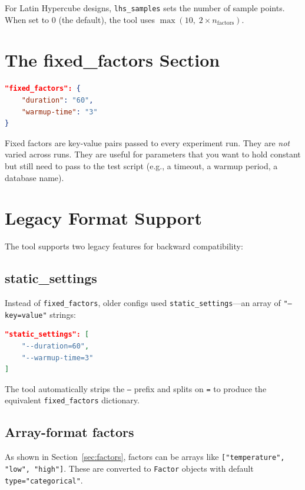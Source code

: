 \documentclass[11pt]{book}
\begin{document}
For Latin Hypercube designs, \texttt{lhs\_samples} sets the number of sample points. When set to 0 (the default), the tool uses $\max(10,\; 2 \times n_{\text{factors}})$.

\section{The fixed\_factors Section}

\begin{lstlisting}[language=json]
"fixed_factors": {
    "duration": "60",
    "warmup-time": "3"
}
\end{lstlisting}

Fixed factors are key-value pairs passed to every experiment run. They are \emph{not} varied across runs. They are useful for parameters that you want to hold constant but still need to pass to the test script (e.g., a timeout, a warmup period, a database name).

\section{Legacy Format Support}

The tool supports two legacy features for backward compatibility:

\subsection{static\_settings}

Instead of \texttt{fixed\_factors}, older configs used \texttt{static\_settings}---an array of \texttt{"--key=value"} strings:

\begin{lstlisting}[language=json]
"static_settings": [
    "--duration=60",
    "--warmup-time=3"
]
\end{lstlisting}

The tool automatically strips the \texttt{--} prefix and splits on \texttt{=} to produce the equivalent \texttt{fixed\_factors} dictionary.

\subsection{Array-format factors}

As shown in Section~\ref{sec:factors}, factors can be arrays like \texttt{["temperature", "low", "high"]}. These are converted to \texttt{Factor} objects with default \texttt{type="categorical"}.
\end{document}
